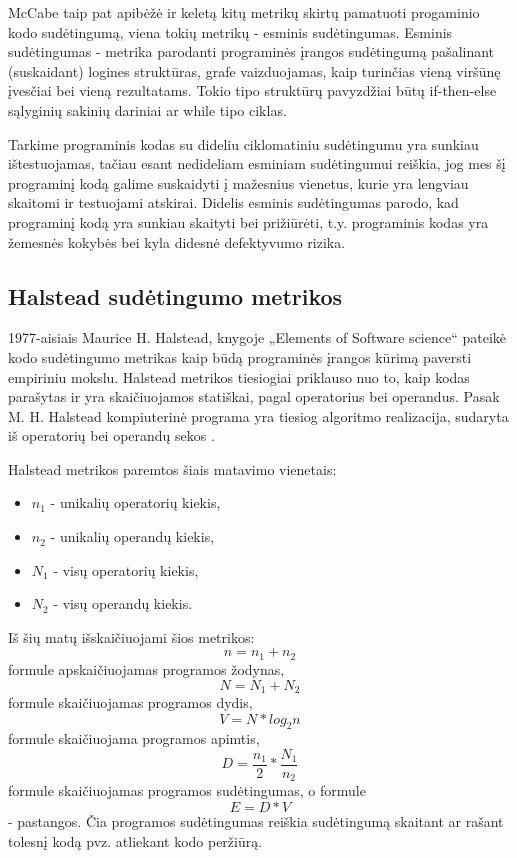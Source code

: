 \documentclass{VUMIFPSbakalaurinis}
\begin{document}
McCabe taip pat apibėžė ir keletą kitų metrikų skirtų pamatuoti progaminio kodo sudėtingumą, viena tokių metrikų - esminis sudėtingumas. Esminis sudėtingumas - metrika parodanti programinės įrangos sudėtingumą pašalinant (suskaidant) logines struktūras, grafe vaizduojamas, kaip turinčias vieną viršūnę įvesčiai bei vieną rezultatams. Tokio tipo struktūrų pavyzdžiai būtų if-then-else sąlyginių sakinių dariniai ar while tipo ciklas.

Tarkime programinis kodas su dideliu ciklomatiniu sudėtingumu yra sunkiau ištestuojamas, tačiau esant nedideliam esminiam sudėtingumui reiškia, jog mes šį programinį kodą galime suskaidyti į mažesnius vienetus, kurie yra lengviau skaitomi ir testuojami atskirai. Didelis esminis sudėtingumas parodo, kad programinį kodą yra sunkiau skaityti bei prižiūrėti, t.y. programinis kodas yra žemesnės kokybės bei kyla didesnė defektyvumo rizika.

\subsection{Halstead sudėtingumo metrikos}
1977-aisiais Maurice H. Halstead, knygoje „Elements of Software science“ pateikė kodo sudėtingumo metrikas kaip būdą programinės įrangos kūrimą paversti empiriniu mokslu. Halstead metrikos tiesiogiai priklauso nuo to, kaip kodas parašytas ir yra skaičiuojamos statiškai, pagal operatorius bei operandus. Pasak M. H. Halstead kompiuterinė programa yra tiesiog algoritmo realizacija, sudaryta iš operatorių bei operandų sekos \cite{Halstead:1977:ESS:540137}.

Halstead metrikos paremtos šiais matavimo vienetais:
\begin{itemize}  
\item[]\(n_1\) - unikalių operatorių kiekis,
\item[]\(n_2\) - unikalių operandų kiekis,
\item[]\(N_1\) - visų operatorių kiekis,
\item[]\(N_2\) - visų operandų kiekis.
\end{itemize} 
Iš šių matų išskaičiuojami šios metrikos: \[n =  n_1 + n_2\]formule apskaičiuojamas programos žodynas, \[N = N_1 + N_2\]formule skaičiuojamas programos dydis, \[V = N * log_2n\]formule skaičiuojama programos apimtis, \[D = \frac{n_1}{2} * \frac{N_1}{n_2}\]formule skaičiuojamas programos sudėtingumas, o formule \[E = D * V\] - pastangos. Čia programos sudėtingumas reiškia sudėtingumą skaitant ar rašant tolesnį kodą pvz. atliekant kodo peržiūrą.
\end{document}
